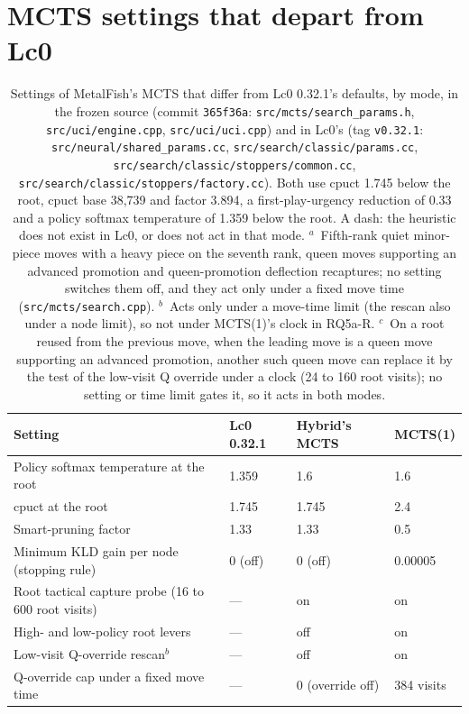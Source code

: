 \documentclass{article}
\newcommand{\MF}{MetalFish}
\begin{document}
\section{MCTS settings that depart from Lc0}
\label{app:mcts}
\begin{table}[ht]
\centering
\caption{Settings of \MF{}'s MCTS that differ from Lc0 0.32.1's defaults, by mode, in the frozen source (commit \texttt{365f36a}: \texttt{src/mcts/search\_params.h}, \texttt{src/uci/engine.cpp}, \texttt{src/uci/uci.cpp}) and in Lc0's (tag \texttt{v0.32.1}: \texttt{src/neural/shared\_params.cc}, \texttt{src/search/classic/params.cc}, \texttt{src/search/classic/stoppers/common.cc}, \texttt{src/search/classic/stoppers/factory.cc}). Both use cpuct 1.745 below the root, cpuct base 38{,}739 and factor 3.894, a first-play-urgency reduction of 0.33 and a policy softmax temperature of 1.359 below the root. A dash: the heuristic does not exist in Lc0, or does not act in that mode. $^{a}$~Fifth-rank quiet minor-piece moves with a heavy piece on the seventh rank, queen moves supporting an advanced promotion and queen-promotion deflection recaptures; no setting switches them off, and they act only under a fixed move time (\texttt{src/mcts/search.cpp}). $^{b}$~Acts only under a move-time limit (the rescan also under a node limit), so not under MCTS(1)'s clock in RQ5a-R. $^{c}$~On a root reused from the previous move, when the leading move is a queen move supporting an advanced promotion, another such queen move can replace it by the test of the low-visit Q override under a clock (24 to 160 root visits); no setting or time limit gates it, so it acts in both modes.}
\label{tab:mcts-departures}
\footnotesize
\begin{tabular}{llll}
\toprule
Setting & Lc0 0.32.1 & Hybrid's MCTS & MCTS(1) \\
\midrule
Policy softmax temperature at the root & 1.359 & 1.6 & 1.6 \\
cpuct at the root & 1.745 & 1.745 & 2.4 \\
Smart-pruning factor & 1.33 & 1.33 & 0.5 \\
Minimum KLD gain per node (stopping rule) & 0 (off) & 0 (off) & 0.00005 \\
Root tactical capture probe (16 to 600 root visits) & --- & on & on \\
High- and low-policy root levers & --- & off & on \\
Low-visit Q-override rescan$^{b}$ & --- & off & on \\
Q-override cap under a fixed move time & --- & 0 (override off) & 384 visits \\

\end{tabular}
\end{table}
\end{document}
